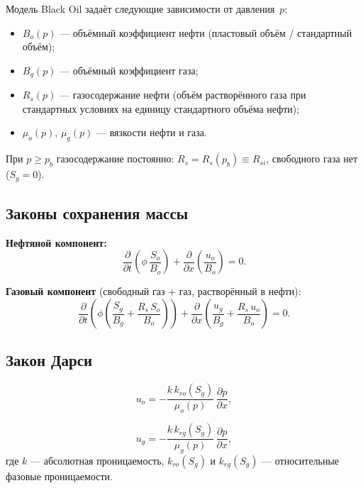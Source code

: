 \documentclass[12pt,a4paper]{article}
\begin{document}
Модель Black Oil задаёт следующие зависимости от давления~$p$:
\begin{itemize}
  \item $B_o(p)$ --- объёмный коэффициент нефти (пластовый объём / стандартный объём);
  \item $B_g(p)$ --- объёмный коэффициент газа;
  \item $R_s(p)$ --- газосодержание нефти (объём растворённого газа при стандартных
        условиях на единицу стандартного объёма нефти);
  \item $\mu_o(p)$, $\mu_g(p)$ --- вязкости нефти и газа.
\end{itemize}

При $p \ge p_b$ газосодержание постоянно: $R_s = R_s(p_b) \equiv R_{si}$,
свободного газа нет ($S_g = 0$).

\subsection{Законы сохранения массы}

\textbf{Нефтяной компонент:}
\begin{equation}\label{eq:oil_conservation}
  \frac{\partial}{\partial t}\left(\phi\,\frac{S_o}{B_o}\right)
  + \frac{\partial}{\partial x}\left(\frac{u_o}{B_o}\right) = 0.
\end{equation}

\textbf{Газовый компонент} (свободный газ + газ, растворённый в нефти):
\begin{equation}\label{eq:gas_conservation}
  \frac{\partial}{\partial t}\left(\phi\left(\frac{S_g}{B_g}
  + \frac{R_s\,S_o}{B_o}\right)\right)
  + \frac{\partial}{\partial x}\left(\frac{u_g}{B_g}
  + \frac{R_s\,u_o}{B_o}\right) = 0.
\end{equation}

\subsection{Закон Дарси}

\begin{equation}\label{eq:darcy_oil}
  u_o = -\frac{k\,k_{ro}(S_g)}{\mu_o(p)}\,\frac{\partial p}{\partial x},
\end{equation}

\begin{equation}\label{eq:darcy_gas}
  u_g = -\frac{k\,k_{rg}(S_g)}{\mu_g(p)}\,\frac{\partial p}{\partial x},
\end{equation}
где $k$ --- абсолютная проницаемость, $k_{ro}(S_g)$ и $k_{rg}(S_g)$ ---
относительные фазовые проницаемости.
\end{document}
